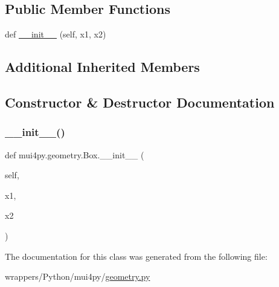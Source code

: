 \subsection*{Public Member Functions}
\begin{DoxyCompactItemize}
\item 
def \hyperlink{classmui4py_1_1geometry_1_1_box_a6f3bc905897566beee73c83c69b4d209}{\+\_\+\+\_\+init\+\_\+\+\_\+} (self, x1, x2)
\end{DoxyCompactItemize}
\subsection*{Additional Inherited Members}


\subsection{Constructor \& Destructor Documentation}
\mbox{\label{classmui4py_1_1geometry_1_1_box_a6f3bc905897566beee73c83c69b4d209}} 
\subsubsection{\texorpdfstring{\+\_\+\+\_\+init\+\_\+\+\_\+()}{\_\_init\_\_()}}
{\footnotesize\ttfamily def mui4py.\+geometry.\+Box.\+\_\+\+\_\+init\+\_\+\+\_\+ (\begin{DoxyParamCaption}\item[{}]{self,  }\item[{}]{x1,  }\item[{}]{x2 }\end{DoxyParamCaption})}



The documentation for this class was generated from the following file\+:\begin{DoxyCompactItemize}
\item 
wrappers/\+Python/mui4py/\hyperlink{geometry_8py}{geometry.\+py}\end{DoxyCompactItemize}
